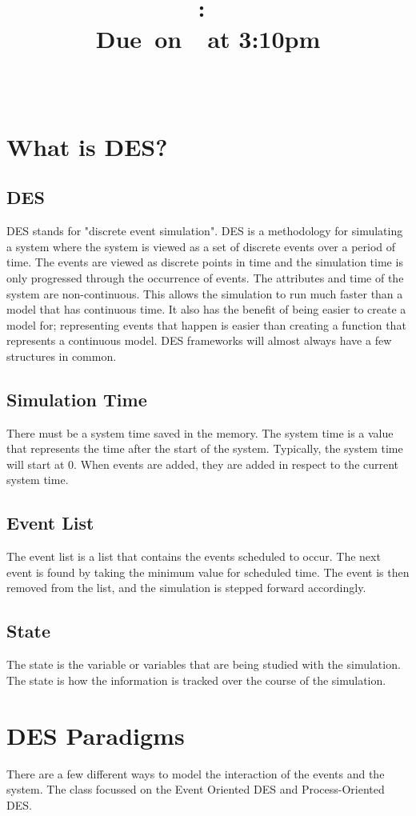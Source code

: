 \documentclass[fleqn]{article}
\title{
    \vspace{2in}
    \textmd{\textbf{\hmwkClass:\ \hmwkTitle}}\\
    \normalsize\vspace{0.1in}\small{Due\ on\ \hmwkDueDate\ at 3:10pm}\\
    \vspace{0.1in}\large{\textit{\hmwkClassInstructor\ \hmwkClassTime}}
    \vspace{3in}
}
\author{\textbf{\hmwkAuthorName}}
\date{}
\begin{document}
\maketitle

\pagebreak
\section{What is DES?}
\subsection{DES}
DES stands for "discrete event simulation". DES is a methodology for simulating a system where the system is viewed as a set of discrete events over a period of time. The events are viewed as discrete points in time and the simulation time is only progressed through the occurrence of events. The attributes and time of the system are non-continuous. This allows the simulation to run much faster than a model that has continuous time. It also has the benefit of being easier to create a model for; representing events that happen is easier than creating a function that represents a continuous model. DES frameworks will almost always have a few structures in common.
 
 \subsection{Simulation Time}
There must be a system time saved in the memory. The system time is a value that represents the time after the start of the system. Typically, the system time will start at 0. When events are added, they are added in respect to the current system time.
\subsection{Event List}
The event list is a list that contains the events scheduled to occur. The next event is found by taking the minimum value for scheduled time. The event is then removed from the list, and the simulation is stepped forward accordingly.
\subsection{State}
The state is the variable or variables that are being studied with the simulation. The state is how the information is tracked over the course of the simulation. 



\section{DES Paradigms}
There are a few different ways to model the interaction of the events and the system. The class focussed on the Event Oriented DES and Process-Oriented DES.
\end{document}
